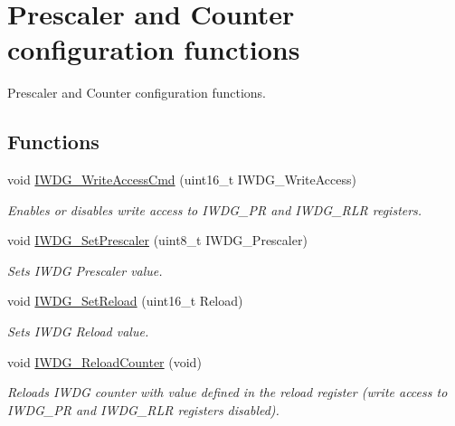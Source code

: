 \hypertarget{group___i_w_d_g___group1}{}\section{Prescaler and Counter configuration functions}
\label{group___i_w_d_g___group1}


Prescaler and Counter configuration functions.  


\subsection*{Functions}
\begin{DoxyCompactItemize}
\item 
void \hyperlink{group___i_w_d_g___group1_gae466681e5bdc11b353c508b89d75ca05}{I\+W\+D\+G\+\_\+\+Write\+Access\+Cmd} (uint16\+\_\+t I\+W\+D\+G\+\_\+\+Write\+Access)
\begin{DoxyCompactList}\small\item\em Enables or disables write access to I\+W\+D\+G\+\_\+\+P\+R and I\+W\+D\+G\+\_\+\+R\+L\+R registers. \end{DoxyCompactList}\item 
void \hyperlink{group___i_w_d_g___group1_ga4fa7f1cd690533a35ad9e4729c0450a3}{I\+W\+D\+G\+\_\+\+Set\+Prescaler} (uint8\+\_\+t I\+W\+D\+G\+\_\+\+Prescaler)
\begin{DoxyCompactList}\small\item\em Sets I\+W\+D\+G Prescaler value. \end{DoxyCompactList}\item 
void \hyperlink{group___i_w_d_g___group1_gae2a14752a0431f23cb80cebf202ac365}{I\+W\+D\+G\+\_\+\+Set\+Reload} (uint16\+\_\+t Reload)
\begin{DoxyCompactList}\small\item\em Sets I\+W\+D\+G Reload value. \end{DoxyCompactList}\item 
void \hyperlink{group___i_w_d_g___group1_ga7147ebabdc3fef97f532b171a4e70d49}{I\+W\+D\+G\+\_\+\+Reload\+Counter} (void)
\begin{DoxyCompactList}\small\item\em Reloads I\+W\+D\+G counter with value defined in the reload register (write access to I\+W\+D\+G\+\_\+\+P\+R and I\+W\+D\+G\+\_\+\+R\+L\+R registers disabled). \end{DoxyCompactList}\end{DoxyCompactItemize}


